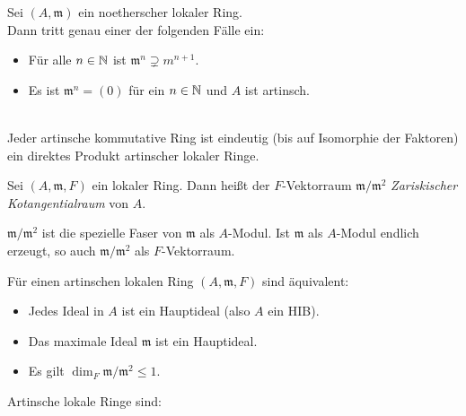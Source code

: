 \documentclass{cheat-sheet}
\newcommand{\mmm}{\mathfrak{m}}
\begin{document}
\begin{prop}
  Sei $(A, \mmm)$ ein noetherscher lokaler Ring. \\
  Dann tritt genau einer der folgenden Fälle ein:
  \begin{itemize}
    \item Für alle $n \in \mathbb{N}$ ist $\mmm^n \supsetneq m^{n+1}$.
    \item Es ist $\mmm^n = (0)$ für ein $n \in \mathbb{N}$ und $A$ ist artinsch.
  \end{itemize}
\end{prop}

\begin{satz} \mbox{} \\
  Jeder artinsche kommutative Ring ist eindeutig (bis auf Isomorphie der Faktoren) ein direktes Produkt artinscher lokaler Ringe.
\end{satz}


\begin{defn}
  Sei $(A, \mmm, F)$ ein lokaler Ring.
  Dann heißt der $F$-Vektorraum $\mmm / \mmm^2$ \emph{Zariskischer Kotangentialraum} von $A$.
\end{defn}

\begin{bem}
  $\mmm / \mmm^2$ ist die spezielle Faser von $\mmm$ als $A$-Modul.
  Ist $\mmm$ als $A$-Modul endlich erzeugt, so auch $\mmm / \mmm^2$ als $F$-Vektorraum.
\end{bem}

\begin{prop}
  Für einen artinschen lokalen Ring $(A, \mmm, F)$ sind äquivalent:
  \begin{itemize}
    \item Jedes Ideal in $A$ ist ein Hauptideal (also $A$ ein HIB).
    \item Das maximale Ideal $\mmm$ ist ein Hauptideal.
    \item Es gilt $\dim_F \mmm / \mmm^2 \leq 1$.
  \end{itemize}
\end{prop}

\begin{bspe}
  Artinsche lokale Ringe sind:
  \begin{itemize}
     \quad
  \end{itemize}
\end{bspe}
\end{document}
